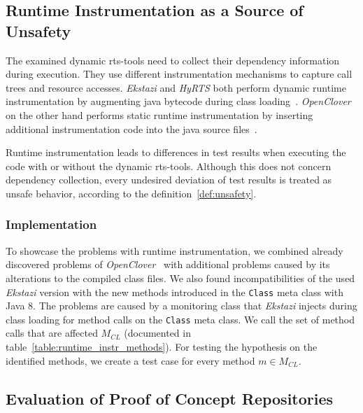 \subsection{Runtime Instrumentation as a Source of Unsafety}\label{ssec:runtime_instrumentation}

The examined dynamic \ac{rts}-tools need to collect their dependency information during execution.
They use different instrumentation mechanisms to capture call trees and resource accesses. \emph{Ekstazi} and
\emph{HyRTS} both perform dynamic runtime instrumentation by augmenting java bytecode during class
loading~\cite{ekstazimain,hyrts_paper,java_instrumentation}. \emph{OpenClover} on the other hand performs static runtime
instrumentation by inserting additional instrumentation code into the java source files~\cite{clover_documentation,java_instrumentation}.

\begin{hypothesis}\label{hyp:instrumentation}
    Runtime instrumentation leads to differences in test results when executing the code with or without
    the dynamic \ac{rts}-tools. Although this does not concern dependency collection, every undesired
    deviation of test results is treated as unsafe behavior, according to the definition~\ref{def:unsafety}.
\end{hypothesis}

\subsubsection{Implementation }
To showcase the problems with runtime instrumentation, we combined already discovered problems of
\emph{OpenClover}~\cite{unsafety_eval} with additional problems caused by its alterations to the compiled
class files. We also found incompatibilities of the used \emph{Ekstazi} version with the new methods
introduced in the \texttt{Class} meta class with Java 8. The problems are caused by a monitoring class
that \emph{Ekstazi} injects during class loading for method calls on the \texttt{Class} meta class. We call the
set of method calls that are affected $M_{CL}$
(documented in table~\ref{table:runtime_instr_methods}). For testing the hypothesis on the identified
methods, we create a test case for every method $m \in M_{CL}$.

\subsection{Evaluation of Proof of Concept Repositories}

